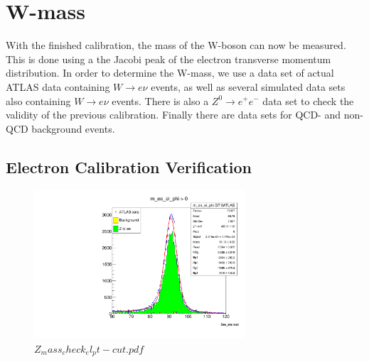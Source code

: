 \section{W-mass}
\label{sec:w-mass}
With the finished calibration, the mass of the W-boson can now be measured. This is done using a the Jacobi peak of the electron transverse momentum distribution.
In order to determine the W-mass, we use a data set of actual ATLAS data containing $W \rightarrow e\nu$ events,
as well as several simulated data sets also containing $W \rightarrow e\nu$ events. 
There is also a $Z^0 \rightarrow e^+e^-$ data set to check the validity of the previous calibration.
Finally there are data sets for QCD- and non-QCD background events.

\subsection{Electron Calibration Verification}
    \label{sec:calibration_verification}
    \begin{figure}[H]
        \centering
        \includegraphics[width=0.7\textwidth]{../W_mass/Z_mass_check_phi_positive.pdf}
        \caption{$Z_mass_check_el_pt-cut.pdf$}
        \label{fig:z-mass_check}
    \end{figure}

